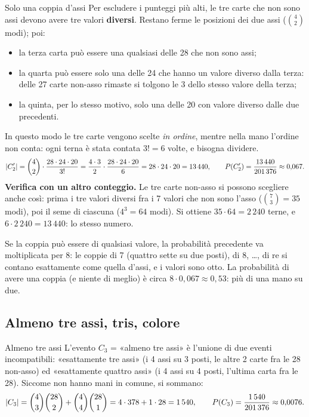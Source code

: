 \begin{esempio}{Solo una coppia d'assi}
Per escludere i punteggi più alti, le tre carte che non sono assi devono avere tre valori \textbf{diversi}. Restano
ferme le posizioni dei due assi ($\binom{4}{2}$ modi); poi:
\begin{itemize}
  \item la terza carta può essere una qualsiasi delle 28 che non sono assi;
  \item la quarta può essere solo una delle 24 che hanno un valore diverso dalla terza: delle 27 carte non-asso
        rimaste si tolgono le 3 dello stesso valore della terza;
  \item la quinta, per lo stesso motivo, solo una delle 20 con valore diverso dalle due precedenti.
\end{itemize}
In questo modo le tre carte vengono scelte \emph{in ordine}, mentre nella mano l'ordine non conta: ogni terna è stata
contata $3! = 6$ volte, e bisogna dividere.
\[
  \left\lvert C_2' \right\rvert = \binom{4}{2} \cdot \frac{28 \cdot 24 \cdot 20}{3!} = \frac{4 \cdot 3}{2} \cdot \frac{28 \cdot 24 \cdot
  20}{6} = 28 \cdot 24 \cdot 20 = 13\,440 ,
  \qquad
  P(C_2') = \frac{13\,440}{201\,376} \approx 0{,}067 .
\]
\textbf{Verifica con un altro conteggio.} Le tre carte non-asso si possono scegliere anche così: prima i tre valori
diversi fra i 7 valori che non sono l'asso ($\binom{7}{3} = 35$ modi), poi il seme di ciascuna ($4^3 = 64$ modi). Si
ottiene $35 \cdot 64 = 2\,240$ terne, e $6 \cdot 2\,240 = 13\,440$: lo stesso numero.
\end{esempio}

Se la coppia può essere di qualsiasi valore, la probabilità precedente va moltiplicata per 8: le coppie di 7 (quattro
sette su due posti), di 8, \ldots, di re si contano esattamente come quella d'assi, e i valori sono otto. La
probabilità di avere una coppia (e niente di meglio) è circa $8 \cdot 0{,}067 \approx 0{,}53$: più di una mano su due.

\subsection{Almeno tre assi, tris, colore}

\begin{esempio}{Almeno tre assi}
L'evento $C_3$ = «almeno tre assi» è l'unione di due eventi incompatibili: «esattamente tre assi» (i 4 assi su 3
posti, le altre 2 carte fra le 28 non-asso) ed «esattamente quattro assi» (i 4 assi su 4 posti, l'ultima carta fra le
28). Siccome non hanno mani in comune, si sommano:
\[
  \left\lvert C_3 \right\rvert = \binom{4}{3}\binom{28}{2} + \binom{4}{4}\binom{28}{1} = 4 \cdot 378 + 1 \cdot 28 = 1\,540 ,
  \qquad
  P(C_3) = \frac{1\,540}{201\,376} \approx 0{,}0076 .
\]
\end{esempio}

